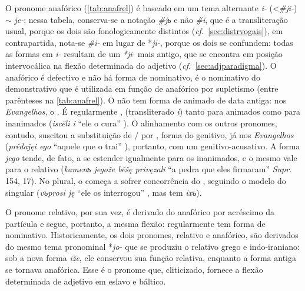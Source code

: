 O pronome anafórico (\autoref{tab:anafrel}) é baseado em um tema alternante
\emph{i-} (<\emph{\#ji-}) $\sim$ \emph{je-}; nessa
tabela, conserva-se a notação \emph{\#jь} e não \emph{\#i}, que é a
transliteração usual, porque os dois são fonologicamente distintos
(\emph{cf.}~\ref{sec:distrvogais}), em contrapartida, nota-se \emph{\#i-} em
lugar de *\emph{ji-},
porque os dois se confundem: todas as formas em \emph{i-} resultam de um
\emph{*ji}- mais antigo, que se encontra em posição intervocálica na
flexão determinada do adjetivo (\emph{cf.}~\ref{sec:adjparadigma}). 
O anafórico é
defectivo e não há forma de nominativo, é o nominativo do demonstrativo
 que é utilizada em função de anafórico por supletismo (entre
parênteses na \autoref{tab:anafrel}).
O  não tem forma de animado de data antiga:
nos \emph{Evangelhos}, o . É regularmente ,
(transliterado \emph{i}) tanto para animados como para inanimados
(\emph{iscěli i} ``ele o cura'' ). O alinhamento com os outros
pronomes, contudo, suscitou a substituição de / por
, forma do genitivo, já nos \emph{Evangelhos}
(\emph{prědajęi ego} ``aquele que o trai'' ), portanto, com um
genitivo-acusativo. A forma \emph{jego} tende, de fato, a se estender
igualmente para os inanimados, e o mesmo vale para o relativo
 (\emph{kamenь jegože běšę privęzali} ``a pedra que eles
firmaram'' \emph{Supr.} 154, 17). No plural, o   começa
a sofrer concorrência do  , seguindo o modelo do
singular (\emph{vъprosi ję} ``ele os interrogou'' 
, mas  tem \emph{ixъ}).

O pronome relativo, por sua vez, é derivado do anafórico por acréscimo
da partícula  e segue, portanto, a mesma flexão:
regularmente tem forma de nominativo. Historicamente, os dois pronomes,
relativo e anafórico, são derivados do mesmo tema pronominal *\emph{jo-}
que se produziu o relativo grego e indo-iraniano: sob a nova forma
\emph{iže}, ele conservou sua função relativa, enquanto a forma antiga
se tornava anafórica. Esse é o pronome que, cliticizado, fornece a
flexão determinada de adjetivo em eslavo e báltico.



